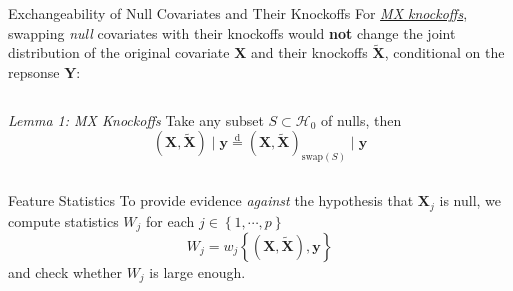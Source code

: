     \begin{frame}{Exchangeability of Null Covariates and Their Knockoffs}
        For \underline{\textit{MX knockoffs}}, swapping \textit{null} covariates with their knockoffs would \textbf{not} change the joint distribution of the original covariate $\mathbf{X}$ and their knockoffs $\tilde{\mathbf{X}}$, conditional on the repsonse $\mathbf{Y}$:

        \begin{columns}
            \begin{column}{0.95\textwidth}
                \small
                \begin{block}{\textit{Lemma 1: MX Knockoffs}}
                    Take any subset $S\subset \mathcal{H}_0$ of nulls, then
                    $$
                    \left( \mathbf{X},\tilde{\mathbf{X}} \right)\mid \mathbf{y} \overset{\mathrm{d}}{=} \left(\mathbf{X},\tilde{\mathbf{X}}\right)_{\mathrm{swap}(S)}\mid \mathbf{y}
                    $$
                \end{block}
            \end{column}
        \end{columns}
    \end{frame}

    \begin{frame}{Feature Statistics}
        To provide evidence \textit{against} the hypothesis that $\mathbf{X}_j$ is null, we compute statistics $W_j$ for each $j\in\left\{ 1,\cdots,p \right\}$ 
        $$
        W_j = w_j\left\{ (\mathbf{X},\tilde{\mathbf{X}}),\mathbf{y} \right\}
        $$
        and check whether $W_j$ is large enough.


    \end{frame}

